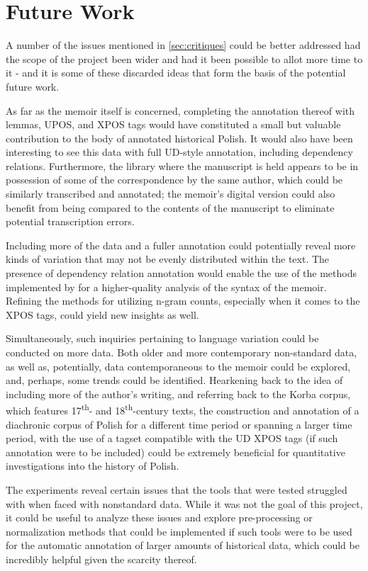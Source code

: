 \section{Future Work}
\label{sec:futurework}

A number of the issues mentioned in \autoref{sec:critiques} could be better addressed had the scope of the project been wider and had it been possible to allot more time to it - and it is some of these discarded ideas that form the basis of the potential future work. 

As far as the memoir itself is concerned, completing the annotation thereof with lemmas, UPOS, and XPOS tags would have constituted a small but valuable contribution to the body of annotated historical Polish. It would also have been interesting to see this data with full UD-style annotation, including dependency relations. Furthermore, the library where the manuscript is held appears to be in possession of some of the correspondence by the same author, which could be similarly transcribed and annotated; the memoir's digital version could also benefit from being compared to the contents of the manuscript to eliminate potential transcription errors.

Including more of the data and a fuller annotation could potentially reveal more kinds of variation that may not be evenly distributed within the text. The presence of dependency relation annotation would enable the use of the methods implemented by \citet{johannsen-etal-2015-cross} for a higher-quality analysis of the syntax of the memoir. Refining the methods for utilizing n-gram counts, especially when it comes to the XPOS tags, could yield new insights as well.

Simultaneously, such inquiries pertaining to language variation could be conducted on more data. Both older and more contemporary non-standard data, as well as, potentially, data contemporaneous to the memoir could be explored, and, perhaps, some trends could be identified. Hearkening back to the idea of including more of the author's writing, and referring back to the Korba corpus, which features 17\textsuperscript{th}- and 18\textsuperscript{th}-century texts, the construction and annotation of a diachronic corpus of Polish for a different time period or spanning a larger time period, with the use of a tagset compatible with the UD XPOS tags (if such annotation were to be included) could be extremely beneficial for quantitative investigations into the history of Polish.

The experiments reveal certain issues that the tools that were tested struggled with when faced with nonstandard data. While it was not the goal of this project, it could be useful to analyze these issues and explore pre-processing or normalization methods that could be implemented if such tools were to be used for the automatic annotation of larger amounts of historical data, which could be incredibly helpful given the scarcity thereof. 

